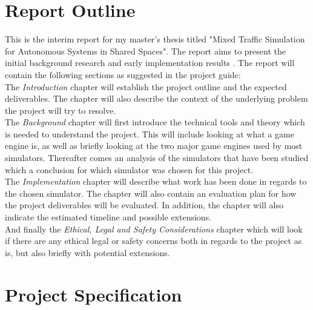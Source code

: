 \newcommand\tab[1][1cm]{\hspace*{#1}}

\section{Report Outline}
This is the interim report for my master's thesis titled "Mixed Traffic Simulation for Autonomous Systems in Shared Spaces". The report aims to present the initial background research and early implementation results \cite{studentGuideline}. The report will contain the following sections as suggested in the project guide:
\\ \tab The \emph{Introduction} chapter will establish the project outline and the expected deliverables. The chapter will also describe the context of the underlying problem the project will try to resolve.
\\ \tab The \emph{Background} chapter will first introduce the technical tools and theory which is needed to understand the project. This will include looking at what a game engine is, as well as briefly looking at the two major game engines used by most simulators. Thereafter comes an analysis of the simulators that have been studied which a conclusion for which simulator was chosen for this project. 
\\ \tab The \emph{Implementation} chapter will describe what work has been done in regards to the chosen simulator. The chapter will also contain an evaluation plan for how the project deliverables will be evaluated. In addition, the chapter will also indicate the estimated timeline and possible extensions. 
\\ \tab And finally the \emph{Ethical, Legal and Safety Considerations} chapter which will look if there are any ethical legal or safety concerns both in regards to the project as is, but also briefly with potential extensions.

\pagebreak
\section{Project Specification} \label{ProjectSpec}
